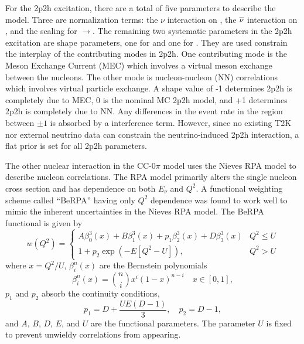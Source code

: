 For the 2p2h excitation, there are a total of five parameters to describe
the model. Three are normalization terms: the $\nu$ interaction on
, the $\overline{\nu}$ interaction on , and the
scaling for $\rightarrow$. The remaining
two systematic parameters in the 2p2h excitation are shape parameters,
one for  and one for . They are used constrain
the interplay of the contributing modes in 2p2h. One contributing
mode is the Meson Exchange Current (MEC) which involves a virtual
meson exchange between the nucleons. The other mode is nucleon-nucleon
(NN) correlations which involves virtual particle exchange. A shape
value of -1 determines 2p2h is completely due to MEC, 0 is the nominal
MC 2p2h model, and +1 determines 2p2h is completely due to NN. Any
differences in the event rate in the region between $\pm1$ is absorbed
by a interference term. However, since no existing T2K nor external
neutrino data can constrain the neutrino-induced 2p2h interaction,
a flat prior is set for all 2p2h parameters.

The other nuclear interaction in the CC-$0\pi$ model uses the Nieves
RPA model\cite{Nieves:2011pp} to describe nucleon correlations. The
RPA model primarily alters the single nucleon cross section and has
dependence on both $E_{\nu}$ and $Q^{2}$. A functional weighting
scheme called ``BeRPA'' having only $Q^{2}$ dependence was found
to work well to mimic the inherent uncertainties in the Nieves RPA
model. The BeRPA functional is given by
\begin{equation}
w\left(Q^{2}\right)=\begin{cases}
A\beta_{0}^{3}\left(x\right)+B\beta_{1}^{3}\left(x\right)+p_{1}\beta_{2}^{3}\left(x\right)+D\beta_{3}^{3}\left(x\right) & Q^{2}\leq U\\
1+p_{2}\exp\left(-E\left[Q^{2}-U\right]\right), & Q^{2}>U
\end{cases}\label{eq:BeRPA}
\end{equation}
where $x=Q^{2}/U$, $\beta_{i}^{n}\left(x\right)$ are the Bernstein
polynomials\cite{FAROUKI2012379} 
\begin{equation}
\beta_{i}^{n}\left(x\right)=\binom{n}{i}x^{i}\left(1-x\right)^{n-i}\quad x\in[0,1],\label{eq:BernsteinBasis}
\end{equation}
$p_{1}$ and $p_{2}$ absorb the continuity conditions, 
\begin{equation}
p_{1}=D+\frac{UE\left(D-1\right)}{3},\quad p_{2}=D-1,\label{eq:BeRPAContinuity}
\end{equation}
and $A$, $B$, $D$, $E$, and $U$ are the functional parameters.
The parameter $U$ is fixed to prevent unwieldy correlations from
appearing.

